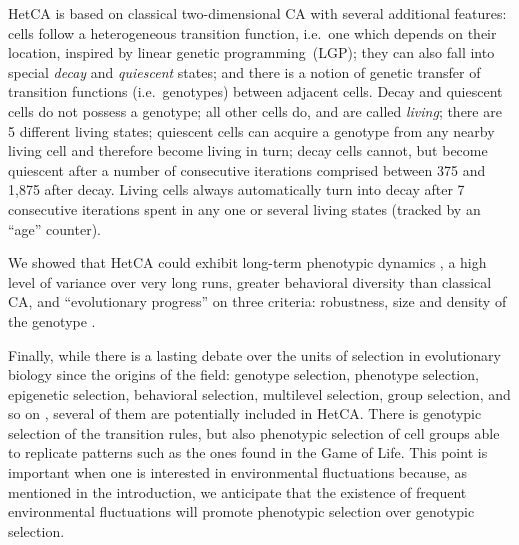 HetCA \citep{medernach2013long} is based on classical two-dimensional CA with several additional features: cells follow a heterogeneous transition function, i.e.~one which depends on their location, inspired by linear genetic programming~(LGP); they can also fall into special \emph{decay} and \emph{quiescent} states; and there is a notion of genetic transfer of transition functions (i.e.~genotypes) between adjacent cells. Decay and quiescent cells do not possess a genotype; all other cells do, and are called \emph{living}; there are 5 different living states; quiescent cells can acquire a genotype from any nearby living cell and therefore become living in turn; decay cells cannot, but become quiescent after a number of consecutive iterations comprised between 375 and 1,875 after decay. Living cells always automatically turn into decay after 7 consecutive iterations spent in any one or several living states (tracked by an ``age'' counter).

We showed that HetCA could exhibit long-term phenotypic dynamics \citep{medernach2013long}, a high level of variance over very long runs, greater behavioral diversity than classical CA, and ``evolutionary progress'' \cite{shanahan2012evolutionary} on three criteria: robustness, size and density of the genotype \citep{medernach2015evolutionary}.

Finally, while there is a lasting debate over the units of selection in evolutionary biology since the origins of the field: genotype selection, phenotype selection, epigenetic selection, behavioral selection, multilevel selection, group selection, and so on \citep{lloyd2012unitsandlevelsofselection,okasha2006evolution}, several of them are potentially included in HetCA. There is genotypic selection of the transition rules, but also phenotypic selection of cell groups able to replicate patterns such as the ones found in the Game of Life. This point is important when one is interested in environmental fluctuations because, as mentioned in the introduction, we anticipate that the existence of frequent environmental fluctuations will promote phenotypic selection over genotypic selection.